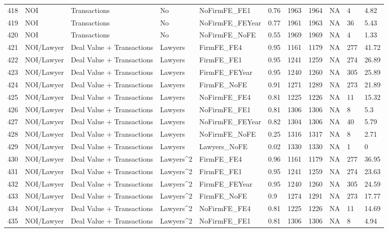 \documentclass{article}
\begin{document}
\begin{table}[H]
\begin{tabular}{rllllllllll}
  418 & NOI & Transactions & No & NoFirmFE\_FE1 & 0.76 & 1963 & 1964 & NA & 4 & 4.82 \\ 
  419 & NOI & Transactions & No & NoFirmFE\_FEYear & 0.77 & 1961 & 1963 & NA & 36 & 5.43 \\ 
  420 & NOI & Transactions & No & NoFirmFE\_NoFE & 0.55 & 1969 & 1969 & NA & 4 & 1.33 \\ 
  421 & NOI/Lawyer & Deal Value + Transactions & Lawyers & FirmFE\_FE4 & 0.95 & 1161 & 1179 & NA & 277 & 41.72 \\ 
  422 & NOI/Lawyer & Deal Value + Transactions & Lawyers & FirmFE\_FE1 & 0.95 & 1241 & 1259 & NA & 274 & 26.89 \\ 
  423 & NOI/Lawyer & Deal Value + Transactions & Lawyers & FirmFE\_FEYear & 0.95 & 1240 & 1260 & NA & 305 & 25.89 \\ 
  424 & NOI/Lawyer & Deal Value + Transactions & Lawyers & FirmFE\_NoFE & 0.91 & 1271 & 1289 & NA & 273 & 21.89 \\ 
  425 & NOI/Lawyer & Deal Value + Transactions & Lawyers & NoFirmFE\_FE4 & 0.81 & 1225 & 1226 & NA & 11 & 15.32 \\ 
  426 & NOI/Lawyer & Deal Value + Transactions & Lawyers & NoFirmFE\_FE1 & 0.81 & 1306 & 1306 & NA & 8 & 5.3 \\ 
  427 & NOI/Lawyer & Deal Value + Transactions & Lawyers & NoFirmFE\_FEYear & 0.82 & 1304 & 1306 & NA & 40 & 5.79 \\ 
  428 & NOI/Lawyer & Deal Value + Transactions & Lawyers & NoFirmFE\_NoFE & 0.25 & 1316 & 1317 & NA & 8 & 2.71 \\ 
  429 & NOI/Lawyer & Deal Value + Transactions & Lawyers & Lawyers\_NoFE & 0.02 & 1330 & 1330 & NA & 1 & 0 \\ 
  430 & NOI/Lawyer & Deal Value + Transactions & Lawyers^2 & FirmFE\_FE4 & 0.96 & 1161 & 1179 & NA & 277 & 36.95 \\ 
  431 & NOI/Lawyer & Deal Value + Transactions & Lawyers^2 & FirmFE\_FE1 & 0.95 & 1241 & 1259 & NA & 274 & 23.63 \\ 
  432 & NOI/Lawyer & Deal Value + Transactions & Lawyers^2 & FirmFE\_FEYear & 0.95 & 1240 & 1260 & NA & 305 & 24.59 \\ 
  433 & NOI/Lawyer & Deal Value + Transactions & Lawyers^2 & FirmFE\_NoFE & 0.9 & 1274 & 1291 & NA & 273 & 17.77 \\ 
  434 & NOI/Lawyer & Deal Value + Transactions & Lawyers^2 & NoFirmFE\_FE4 & 0.81 & 1225 & 1226 & NA & 11 & 14.69 \\ 
  435 & NOI/Lawyer & Deal Value + Transactions & Lawyers^2 & NoFirmFE\_FE1 & 0.81 & 1306 & 1306 & NA & 8 & 4.94 \\ 

\end{tabular}
\end{table}
\end{document}
